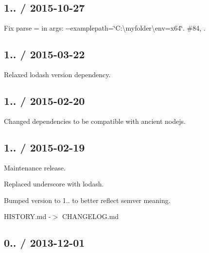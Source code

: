 \subsection*{1.. / 2015-\/10-\/27 }


\begin{DoxyItemize}
\item Fix parse {\ttfamily =} in args\+: {\ttfamily -\/-\/examplepath=\char`\"{}\+C\+:\textbackslash{}myfolder\textbackslash{}env=x64\char`\"{}}. \#84, .
\end{DoxyItemize}

\subsection*{1.. / 2015-\/03-\/22 }


\begin{DoxyItemize}
\item Relaxed lodash version dependency.
\end{DoxyItemize}

\subsection*{1.. / 2015-\/02-\/20 }


\begin{DoxyItemize}
\item Changed dependencies to be compatible with ancient nodejs.
\end{DoxyItemize}

\subsection*{1.. / 2015-\/02-\/19 }


\begin{DoxyItemize}
\item Maintenance release.
\item Replaced {\ttfamily underscore} with {\ttfamily lodash}.
\item Bumped version to 1.. to better reflect semver meaning.
\item H\+I\+S\+T\+O\+R\+Y.\+md -\/$>$ C\+H\+A\+N\+G\+E\+L\+O\+G.\+md
\end{DoxyItemize}

\subsection*{0.. / 2013-\/12-\/01 }


